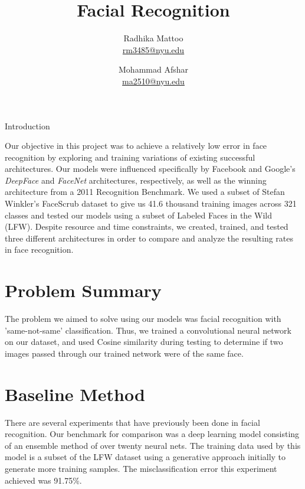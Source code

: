 \documentclass[11pt]{article}
\title{Facial Recognition}
\author{Radhika Mattoo \\ \href{mailto:rm3485@nyu.edu}{rm3485@nyu.edu}
   \and Mohammad Afshar \\ \href{mailto:ma2510@nyu.edu}{ma2510@nyu.edu} }
\begin{document}
\maketitle
\newcommand{\slugmaster}


\section{Introduction}
\par
Our objective in this project was to achieve a relatively low error in face recognition by exploring and training variations of existing successful architectures. Our models were influenced specifically by Facebook and Google's \textit{DeepFace} and \textit{FaceNet} architectures, respectively, as well as the winning architecture from a 2011 Recognition Benchmark. We used a subset of Stefan Winkler's FaceScrub dataset to give us 41.6 thousand training images across 321 classes and tested our models using a subset of Labeled Faces in the Wild (LFW). Despite resource and time constraints, we created, trained, and tested three different architectures in order to compare and analyze the resulting rates in face recognition.
\section{Problem Summary}
    \par
    The problem we aimed to solve using our models was facial recognition with 'same-not-same' classification. Thus, we trained a convolutional neural network on our dataset, and used Cosine similarity during testing to determine if two images passed through our trained network were of the same face. 
\section{Baseline Method}
\par
There are several experiments that have previously been done in facial recognition. Our benchmark for comparison was a deep learning model consisting of an ensemble method of over twenty neural nets. The training data used by this model is a subset of the LFW dataset using a generative approach initially to generate more training samples. The misclassification error this experiment achieved was 91.75\%. 
\end{document}

